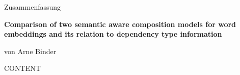 
\begin{center}
	\huge{Zusammenfassung} 
	\vspace{0.5cm}
	
	\large{\bf{Comparison of two semantic aware composition models for word embeddings and its relation to dependency type information}} 
	\vspace{0.5cm}
	
	von Arne Binder \\
\end{center}

\vspace{0.5cm}
\normalsize

CONTENT
